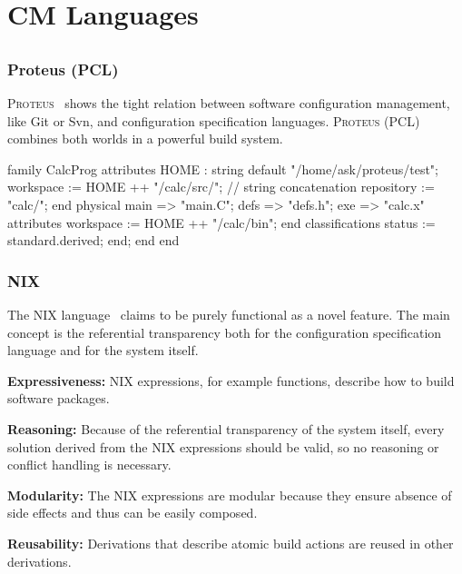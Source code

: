 \section{CM Languages}

\subsection{}

\begin{frame}[fragile]
	\frametitle{Proteus (PCL)}
	\textsc{Proteus}~\cite{tryggeseth1995modelling} shows the tight relation between software configuration management, like Git or Svn, and configuration specification languages.
	\textsc{Proteus} (PCL) combines both worlds in a powerful build system.

	\begin{code}[basicstyle=\tiny,morekeywords={family,attributes,end,physical,default,classifications},gobble=4,language=]
	family CalcProg
		attributes
			HOME : string default "/home/ask/proteus/test";
			workspace := HOME ++ "/calc/src/"; // string concatenation
			repository := "calc/";
			end
		physical
			main => "main.C";
			defs => "defs.h";
			exe => "calc.x" attributes workspace := HOME ++ "/calc/bin"; end
			classifications status := standard.derived; end;
		end
	end
	\end{code}
\end{frame}

\begin{frame}
	\frametitle{NIX}

	The NIX language~\cite{dolstra2007purely} claims to be purely functional as a novel feature.
	The main concept is the referential transparency both for the configuration specification language and for the system itself.

	\textbf{Expressiveness:}
	NIX expressions, for example functions, describe how to build software packages.

	\textbf{Reasoning:}
	Because of the referential transparency of the system itself, every solution derived from the NIX expressions should be valid, so no reasoning or conflict handling is necessary.

	\textbf{Modularity:}
	The NIX expressions are modular because they ensure absence of side effects and thus can be easily composed.

	\textbf{Reusability:}
	Derivations that describe atomic build actions are reused in other derivations.
\end{frame}


